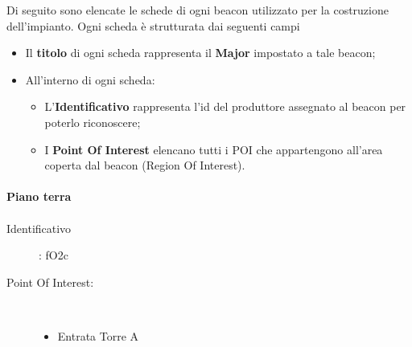 \documentclass[../SperimentazioniPratiche.tex]{subfiles}
\begin{document}
		
		Di seguito sono elencate le schede di ogni beacon utilizzato per la costruzione dell'impianto. Ogni scheda è strutturata dai seguenti campi
		\begin{itemize}
			\item Il \textbf{titolo} di ogni scheda rappresenta il \textbf{Major} impostato a tale beacon;
			\item All'interno di ogni scheda:
			\begin{itemize}
				\item L'\textbf{Identificativo} rappresenta l'id del produttore assegnato al beacon per poterlo riconoscere;
				\item I \textbf{Point Of Interest} elencano tutti i POI che appartengono all'area coperta dal beacon (Region Of Interest).
			\end{itemize}
		\end{itemize}
		
		\newpage
		\paragraph{Piano terra}		
		
			\paragraph*{}
			\label{00000}
			\begin{tcolorbox}[fonttitle=\bfseries, 
								adjusted title={\Large Beacon 00000},
								sharp corners=south,
								colback=white, 
								colframe=white!50!blue!75!black]
								
				\begin{description}%
					\item[Identificativo]: fO2c

					\tcbline					
					
					\item[Point Of Interest:] \ \par
					\begin{itemize}
						\item Entrata Torre A
					\end{itemize}					   				
				\end{description}  				
			\end{tcolorbox}
			
\end{document}
